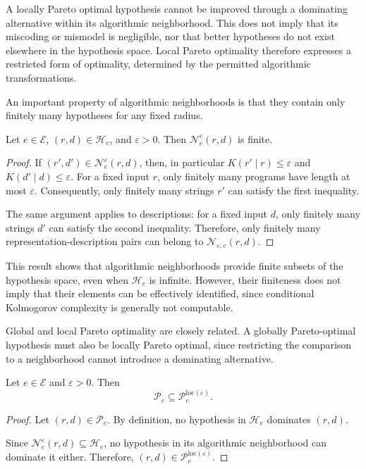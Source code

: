 A locally Pareto optimal hypothesis cannot be improved through a dominating alternative within its algorithmic neighborhood. This does not imply that its miscoding or mismodel is negligible, nor that better hypotheses do not exist elsewhere in the hypothesis space. Local Pareto optimality therefore expresses a restricted form of optimality, determined by the permitted algorithmic transformations.

An important property of algorithmic neighborhoods is that they contain only finitely many hypotheses for any fixed radius.

\begin{proposition}
Let $e\in\mathcal E$, $(r,d)\in\mathcal H_e$, and $\varepsilon>0$. Then $\mathcal N^\varepsilon_e(r,d)$ is finite.
\end{proposition}
\begin{proof}
If $(r',d')\in\mathcal N^\varepsilon_e(r,d)$, then, in particular $K(r'\mid r)\leq\varepsilon$ and $K(d'\mid d)\leq\varepsilon$. For a fixed input $r$, only finitely many programs have length at most $\varepsilon$. Consequently, only finitely many strings $r'$ can satisfy the first inequality.

The same argument applies to descriptions: for a fixed input $d$, only finitely many strings $d'$ can satisfy
the second inequality. Therefore, only finitely many representation-description pairs can belong to $\mathcal N_{\varepsilon,e}(r,d)$.
\end{proof}

This result shows that algorithmic neighborhoods provide finite subsets of the hypothesis space, even when $\mathcal H_e$ is infinite. However, their finiteness does not imply that their elements can be effectively identified, since conditional Kolmogorov complexity is generally not computable.

Global and local Pareto optimality are closely related. A globally Pareto-optimal hypothesis must also be locally Pareto optimal, since restricting the comparison to a neighborhood cannot introduce a dominating alternative.

\begin{proposition}
\label{prop:global_implies_local_pareto_eps}
Let $e\in\mathcal E$ and $\varepsilon>0$. Then
\[
\mathcal P_e \subseteq \mathcal P^{\mathrm{loc}(\varepsilon)}_e.
\]
\end{proposition}
\begin{proof}
Let $(r,d)\in\mathcal P_e$. By definition, no hypothesis in $\mathcal H_e$ dominates $(r,d)$.

Since $\mathcal N^\varepsilon_e(r,d) \subseteq\mathcal H_e$, no hypothesis in its algorithmic neighborhood can
dominate it either. Therefore, $(r,d)\in\mathcal P^{\mathrm{loc}(\varepsilon)}_e$.
\end{proof}

